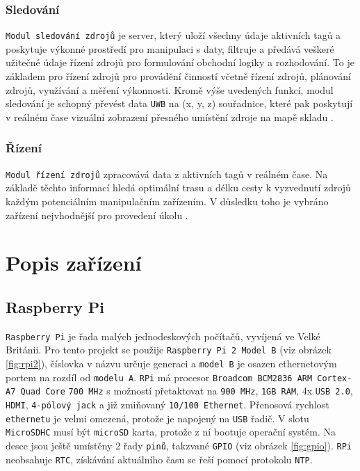 \documentclass[czech,BP]{thesiskiv}
\begin{document}
\subsection{Sledování}
\texttt{Modul sledování zdrojů} je server, který uloží všechny údaje aktivních tagů a poskytuje výkonné prostředí pro manipulaci s daty, filtruje a předává veškeré užitečné údaje řízení zdrojů pro formulování obchodní logiky a rozhodování. To je základem pro řízení zdrojů pro provádění činností včetně řízení zdrojů, plánování zdrojů, využívání a měření výkonnosti. Kromě výše uvedených funkcí, modul sledování je schopný převést data \texttt{UWB} na (x, y, z) souřadnice, které pak poskytují v reálném čase vizuální zobrazení přesného umístění zdroje na mapě skladu \cite{chow2006design}.

\subsection{Řízení}
\texttt{Modul řízení zdrojů} zpracovává data z aktivních tagů v reálném čase. Na základě těchto informací hledá optimální trasu a délku cesty k vyzvednutí zdrojů každým potenciálním manipulačním zařízením. V důsledku toho je vybráno zařízení nejvhodnější pro provedení úkolu \cite{chow2006design}.
	
\chapter{Popis zařízení}
	\section{Raspberry Pi}
		\texttt{Raspberry Pi} je řada malých jednodeskových počítačů, vyvíjená ve Velké Británii. Pro tento projekt se použije \texttt{Raspberry Pi 2 Model B} (viz obrázek \ref{fig:rpi2}), číslovka v názvu určuje generaci a \texttt{model B} je osazen ethernetovým portem na rozdíl od \texttt{modelu A}. \texttt{RPi} má procesor \texttt{Broadcom BCM2836 ARM Cortex-A7 Quad Core} \texttt{700 MHz} s možností přetaktovat na \texttt{900 MHz}, \texttt{1GB RAM}, 4x \texttt{USB 2.0}, \texttt{HDMI}, \texttt{4-pólový jack} a již zmiňovaný \texttt{10/100 Ethernet}. Přenosová rychlost \texttt{ethernetu} je velmi omezená, protože je napojený na \texttt{USB} řadič. V slotu \texttt{MicroSDHC} musí být \texttt{microSD} karta, protože z ní bootuje operační systém. Na desce jsou ještě umístěny 2 řady \texttt{pinů}, takzvané \texttt{GPIO} (viz obrázek \ref{fig:gpio}). \texttt{RPi} neobsahuje \texttt{RTC}, získávání aktuálního času se řeší pomocí protokolu \texttt{NTP}.
	
\end{document}

